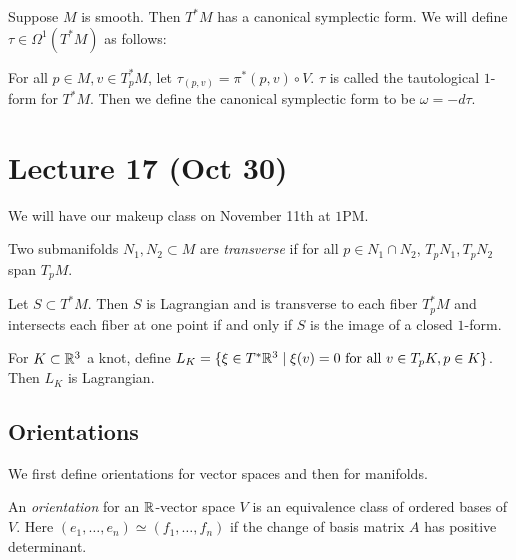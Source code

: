 \documentclass[twoside, 10pt]{article}
\begin{document}
    \begin{exm}
        Suppose $M$ is smooth. Then $T^*M$ has a canonical symplectic form. We will define $\tau \in \Omega^1(T^*M)$ as follows:

        For all $p \in M, v\in T^*_p M$, let $\tau_{(p,v)} = \pi^*(p,v) \circ V$. $\tau$ is called the tautological $1$-form for $T^*M$. Then we define the canonical symplectic form to be $\omega = -d\tau$.
    \end{exm}

    \section{Lecture 17 (Oct 30)}%
    \label{sec:lecture_17_oct_30_}
    
    We will have our makeup class on November 11th at $1$PM.

    \begin{defn}
        Two submanifolds $N_1,N_2 \subset M$ are \textit{transverse} if for all $p \in N_1 \cap N_2$, $T_pN_1, T_pN_2$ span $T_pM$.
    \end{defn}

    \begin{exer}[Homework]
        Let $S \subset T^*M$. Then $S$ is Lagrangian and is transverse to each fiber $T_p^*M$ and intersects each fiber at one point if and only if $S$ is the image of a closed $1$-form.
    \end{exer}

    \begin{exm}
        For $K \subset \mathbb{R}^3$ a knot, define $L_K = \{ \xi \in T^*\mathbb{R}^3 \mid \xi(v) = 0 \text{ for all } v \in T_pK, p \in K\}$. Then $L_K$ is Lagrangian.
    \end{exm}

    \subsection{Orientations}%
    \label{sub:orientations}
    
    We first define orientations for vector spaces and then for manifolds.

    \begin{defn}
        An \textit{orientation} for an $\mathbb{R}$-vector space $V$ is an equivalence class of ordered bases of $V$. Here $(e_1, \ldots, e_n) \simeq (f_1, \ldots, f_n)$ if the change of basis matrix $A$ has positive determinant.
    \end{defn}
\end{document}

